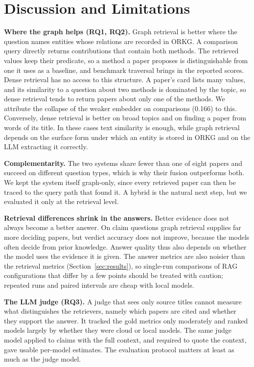 
\section{Discussion and Limitations}
\label{sec:discussion}

\textbf{Where the graph helps (RQ1, RQ2).} Graph retrieval is better where
the question names entities whose relations are recorded in ORKG. A comparison
query directly returns contributions that contain both methods. The retrieved values
keep their predicate, so a method a paper proposes is distinguishable from one
it uses as a baseline, and benchmark traversal brings in the reported scores. Dense retrieval has no
access to this structure. A paper's card lists many values, and its similarity
to a question about two methods is dominated by the topic, so dense retrieval
tends to return papers about only one of the methods. We attribute the
collapse of the weaker embedder on comparisons (0.166) to this. Conversely,
dense retrieval is better on broad topics and on finding a paper from words of
its title. In these cases text similarity is enough, while graph retrieval
depends on the surface form under which an entity is stored in ORKG and on
the LLM extracting it correctly.

\textbf{Complementarity.} The two systems share fewer than one of eight
papers and succeed on different question types, which is why their fusion
outperforms both. We kept the system itself graph-only, since every retrieved
paper can then be traced to the query path that found it. A hybrid is the
natural next step, but we evaluated it only at the retrieval level.

\textbf{Retrieval differences shrink in the answers.} Better evidence does not
always become a better answer. On claim questions graph retrieval supplies far
more deciding papers, but verdict accuracy does not improve, because the
models often decide from prior knowledge. Answer quality thus also depends
on whether the model uses the evidence it is given. The answer metrics are
also noisier than the retrieval metrics (Section~\ref{sec:results}), so
single-run comparisons of RAG configurations that differ by a few points
should be treated with caution; repeated runs and paired intervals are cheap
with local models.

\textbf{The LLM judge (RQ3).} A judge that sees only source titles cannot
measure what distinguishes the retrievers, namely which papers are cited and
whether they support the answer. It tracked the gold metrics only moderately
and ranked models largely by whether they were cloud or local models. The
same judge model applied to claims with the full context, and required to
quote the context, gave usable per-model estimates. The evaluation protocol matters at
least as much as the judge model.

